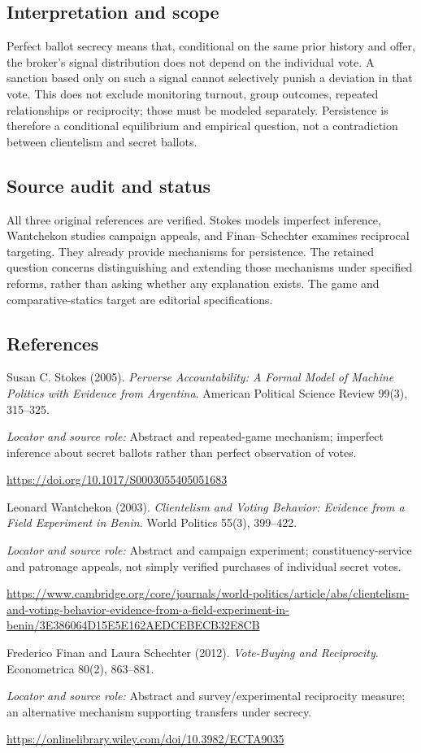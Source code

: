 \documentclass[11pt,a4paper]{article}
\begin{document}
\subsection*{Interpretation and scope}
Perfect ballot secrecy means that, conditional on the same prior history and offer, the broker's signal distribution does not depend on the individual vote. A sanction based only on such a signal cannot selectively punish a deviation in that vote. This does not exclude monitoring turnout, group outcomes, repeated relationships or reciprocity; those must be modeled separately. Persistence is therefore a conditional equilibrium and empirical question, not a contradiction between clientelism and secret ballots.
\subsection*{Source audit and status}
All three original references are verified. Stokes models imperfect inference, Wantchekon studies campaign appeals, and Finan--Schechter examines reciprocal targeting. They already provide mechanisms for persistence. The retained question concerns distinguishing and extending those mechanisms under specified reforms, rather than asking whether any explanation exists. The game and comparative-statics target are editorial specifications.
\subsection*{References}
{\footnotesize\raggedright
\begin{enumerate}[label={\textbf{[S\arabic*]}},leftmargin=3em]
\item Susan C. Stokes (2005). \emph{Perverse Accountability: A Formal Model of Machine Politics with Evidence from Argentina}. American Political Science Review 99(3), 315--325.\par
\textit{Locator and source role:} Abstract and repeated-game mechanism; imperfect inference about secret ballots rather than perfect observation of votes.\par
\url{https://doi.org/10.1017/S0003055405051683}
\item Leonard Wantchekon (2003). \emph{Clientelism and Voting Behavior: Evidence from a Field Experiment in Benin}. World Politics 55(3), 399--422.\par
\textit{Locator and source role:} Abstract and campaign experiment; constituency-service and patronage appeals, not simply verified purchases of individual secret votes.\par
\url{https://www.cambridge.org/core/journals/world-politics/article/abs/clientelism-and-voting-behavior-evidence-from-a-field-experiment-in-benin/3E386064D15E5E162AEDCEBECB32E8CB}
\item Frederico Finan and Laura Schechter (2012). \emph{Vote-Buying and Reciprocity}. Econometrica 80(2), 863--881.\par
\textit{Locator and source role:} Abstract and survey/experimental reciprocity measure; an alternative mechanism supporting transfers under secrecy.\par
\url{https://onlinelibrary.wiley.com/doi/10.3982/ECTA9035}
\end{enumerate}
}
\end{document}
